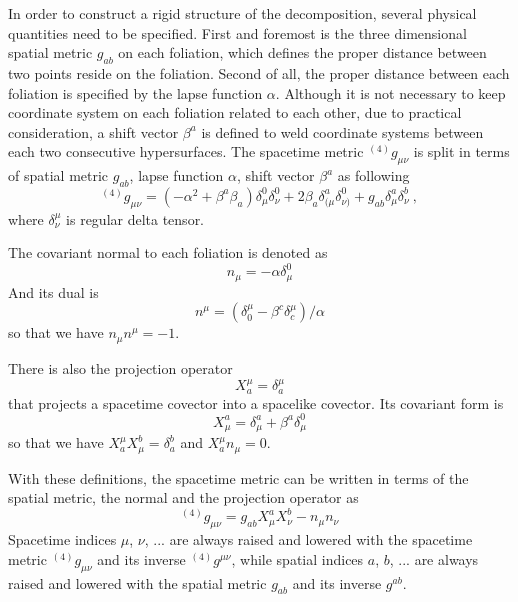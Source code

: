 In order to  construct a rigid structure of the decomposition, several physical quantities need to be specified. First and foremost is the three dimensional spatial metric $g_{ab}$ on each foliation, which defines the proper distance between two points reside on the foliation. Second of all, the proper distance between each foliation is specified by the lapse function $\alpha$. Although it is not necessary to keep coordinate system on each foliation related to each other, due to practical consideration, a shift vector $\beta^{a}$ is defined to weld coordinate systems between each two consecutive hypersurfaces. The spacetime metric $^{(4)}g_{\mu\nu}$ is split in terms of spatial metric $g_{ab}$, lapse function $\alpha$, shift vector $\beta^{a}$ as following
\begin{equation*}
	{}^{\left(4\right)}g_{\mu\nu} = \left(-\alpha^2 + \beta^{a}\beta_{a}\right)\delta_\mu^0\delta_\nu^0 
	+ 2\beta_{a}\delta_{(\mu}^a\delta_{\nu)}^0 + g_{ab} \delta^a_\mu \delta^b_\nu \ ,
\end{equation*}
where $\delta^{\mu}_{\nu}$ is regular delta tensor. 

The covariant normal to each foliation is denoted as
\begin{equation}\label{normal covector}
n_{\mu} = -\alpha\delta^{0}_{\mu}
\end{equation}
 And its dual is
\begin{equation}\label{normal vector}
n^{\mu} = \left(\delta^{\mu}_{0} - \beta^{c}\delta^{\mu}_{c}\right)/\alpha
\end{equation}
so that we have $n_{\mu}n^{\mu} = -1$. 

There is also the projection operator
\begin{equation}\label{projection 1}
X^{\mu}_{a} = \delta^{\mu}_{a}
\end{equation}
that projects a spacetime covector into a spacelike covector. Its covariant form is
\begin{equation}\label{projection 2}
X^{a}_{\mu} = \delta^{a}_{\mu} + \beta^{a}\delta^{0}_{\mu}
\end{equation}
so that we have $X^{\mu}_{a}X^{b}_{\mu} = \delta^{b}_{a}$ and $X^{\mu}_{a}n_{\mu} = 0$. 

With these definitions, the spacetime metric can be written in terms of the spatial metric, the normal and the projection operator as
\begin{equation}\label{spacetime metric 3 + 1}
^{\left(4\right)}g_{\mu\nu} = g_{ab}X^{a}_{\mu}X^{b}_{\nu} - n_{\mu}n_{\nu}
\end{equation}
Spacetime indices $\mu$, $\nu$, ... are always raised and lowered with the spacetime metric $^{\left(4\right)}g_{\mu\nu}$ and its inverse $^{\left(4\right)}g^{\mu\nu}$, while spatial indices $a$, $b$, ... are always raised and lowered with the spatial metric $g_{ab}$ and its inverse $g^{ab}$. 

